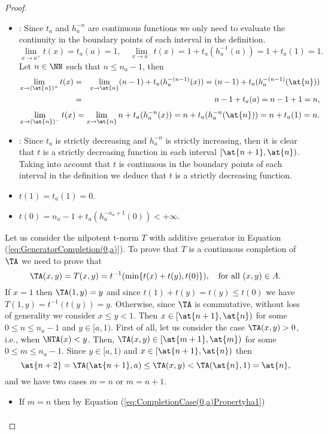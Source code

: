 \begin{proof}
\begin{itemize}
		\begin{itemize}
			\item \underline{}: Since $t_a$ and $h_a^{-n}$ are continuous functions we only need to evaluate the continuity in the boundary points of each interval in the definition.
			$$\lim_{x \to a^+} t(x) = t_a(a)=1, \quad \lim_{x \to a^-} t(x) = 1 + t_a(h_a^{-1}(a))= 1 + t_a(1)=1.$$
			Let $n \in \NN$ such that $n \leq n_a-1$, then
			\begin{eqnarray*}
				\lim_{x \to (\at{n})^+} t(x) &=& \lim_{x \to \at{n}} (n-1) + t_a(h_a^{-(n-1)}(x)) =(n-1) + t_a(h_a^{-(n-1)}(\at{n})) \\
				&=& n-1+t_a(a)=n-1+1=n, 
			\end{eqnarray*}
			$$\lim_{x \to (\at{n})^-}t(x)= \lim_{x \to \at{n}} n+t_a(h_a^{-n}(x)) = n+t_a(h_a^{-n}(\at{n})) = n + t_a(1)=n.$$
			\item \underline{}: Since $t_a$ is strictly decreasing and $h_a^{-n}$ is strictly increasing, then it is clear that $t$ is a strictly decreasing function in each interval $[\at{n+1},\at{n})$. Taking into account that $t$ is continuous in the boundary points of each interval in the definition  we deduce that $t$ is a strictly decreasing function.
			\item $t(1)=t_a(1)=0$.
			\item $t(0)= n_a-1+t_a(h_a^{-n_a+1}(0))<+\infty$.
		\end{itemize}
		Let us consider the nilpotent t-norm $T$ with additive generator in Equation (\ref{eq:GeneratorCompletion(0,a)}). To prove that $T$ is a continuous completion of $\TA$ we need to prove that
		$$\TA(x,y)=T(x,y)=t^{-1}(\min \{t(x)+t(y),t(0)\}), \quad \text{for all } (x,y) \in A.$$
		If $x=1$ then $\TA(1,y)=y$ and since $t(1)+t(y) = t(y) \leq t(0)$ we have $T(1,y)=t^{-1}(t(y))=y$. Otherwise, since $\TA$ is commutative, without loss of generality we consider $x \leq y<1$. Then $x \in [\at{n+1},\at{n})$ for some $0 \leq n \leq n_a-1$ and $y \in [a,1)$. First of all, let us consider the case $\TA(x,y)>0$, i.e., when $ \NTA(x)<y$. Then, $\TA(x,y) \in [\at{m+1},\at{m})$ for some $0 \leq m \leq n_a-1$. Since $y \in [a,1)$ and $x \in [\at{n+1},\at{n})$ then
		$$\at{n+2}=\TA(\at{n+1},a) \leq \TA(x,y) < \TA(\at{n},1)=\at{n},$$
		and we have two cases $m=n$ or $m=n+1$.
		\begin{itemize}
			\item If $m=n$ then by Equation (\ref{eq:CompletionCase(0,a)Propertyha1})
			\begin{eqnarray*}

\end{eqnarray*}
\end{itemize}
\end{itemize}
\end{proof}
